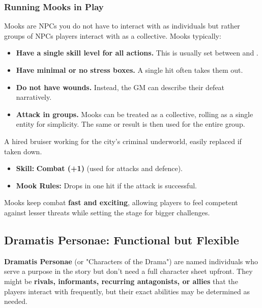 \subsubsection{Running Mooks in Play}
Mooks are NPCs you do not have to interact with as individuals but rather groups of NPCs players interact with as a collective. Mooks typically:
\begin{itemize}
    \item \textbf{Have a single skill level for all actions.} This is usually set between \Weak and \Skilled.
    \item \textbf{Have minimal or no stress boxes.} A single hit often takes them out.
    \item \textbf{Do not have wounds.} Instead, the GM can describe their defeat narratively.
    \item \textbf{Attack in groups.} Mooks can be treated as a collective, rolling as a single entity for simplicity. The same \Attack or \Defend result is then used for the entire group.
\end{itemize}

\begin{WyrdExample}
	A hired bruiser working for the city’s criminal underworld, easily replaced if taken down.
	\begin{itemize}
    	\item \textbf{Skill:} \textbf{Combat (+1)} (used for attacks and defence).
	    \item \textbf{Mook Rules:} Drops in one hit if the attack is successful.
	\end{itemize}
\end{WyrdExample}

Mooks keep combat \textbf{fast and exciting}, allowing players to feel competent against lesser threats while setting the stage for bigger challenges.

\subsection{Dramatis Personae: Functional but Flexible}
\textbf{Dramatis Personae} (or "Characters of the Drama") are named individuals who serve a purpose in the story but don’t need a full character sheet upfront. They might be \textbf{rivals, informants, recurring antagonists, or allies} that the players interact with frequently, but their exact abilities may be determined as needed.

